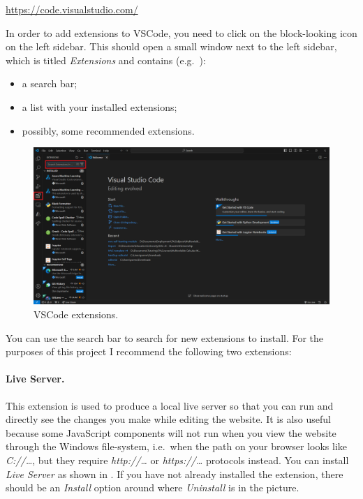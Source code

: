 \documentclass[a4paper,10pt]{article}
\begin{document}
\url{https://code.visualstudio.com/}

In order to add extensions to VSCode, you need to click on the block-looking icon on the left sidebar. This should open a small window next to the left sidebar, which is titled \emph{Extensions} and contains (e.g.\ ):
\begin{itemize}
    \item a search bar;
    \item a list with your installed extensions;
    \item possibly, some recommended extensions.
\end{itemize}

\begin{figure}[htbp]
    \centering
    \includegraphics[width=\textwidth]{extensions.png}
    \caption{VSCode extensions.}
    \label{fig:extensions}   
\end{figure}

You can use the search bar to search for new extensions to install. For the purposes of this project I recommend the following two extensions:

\paragraph{Live Server.} This extension is used to produce a local live server so that you can run and directly see the changes you make while editing the website. It is also useful because some JavaScript components will not run when you view the website through the Windows file-system, i.e.\ when the path on your browser looks like \emph{C://\dots}, but they require \emph{http://\dots} or \emph{https://\dots} protocols instead. You can install \emph{Live Server} as shown in . If you have not already installed the extension, there should be an \emph{Install} option around where \emph{Uninstall} is in the picture.
\end{document}
